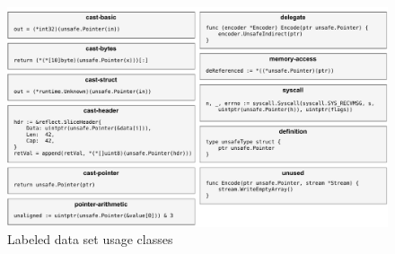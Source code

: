 \begin{figure}[htp!]
    \includegraphics[width=\textwidth]{assets/figures/chapter4/label-examples.pdf}
    \caption{Labeled data set usage classes}
    \label{fig:label-examples}
\end{figure}
